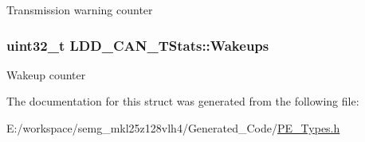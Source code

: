 Transmission warning counter \hypertarget{struct_l_d_d___c_a_n___t_stats_ab59425105119b5b6496a6e0fcc8398d5}{
\subsubsection[{Wakeups}]{\setlength{\rightskip}{0pt plus 5cm}uint32\-\_\-t L\-D\-D\-\_\-\-C\-A\-N\-\_\-\-T\-Stats\-::\-Wakeups}}\label{struct_l_d_d___c_a_n___t_stats_ab59425105119b5b6496a6e0fcc8398d5}
Wakeup counter 

The documentation for this struct was generated from the following file\-:\begin{DoxyCompactItemize}
\item 
E\-:/workspace/semg\-\_\-mkl25z128vlh4/\-Generated\-\_\-\-Code/\hyperlink{_p_e___types_8h}{P\-E\-\_\-\-Types.\-h}\end{DoxyCompactItemize}
